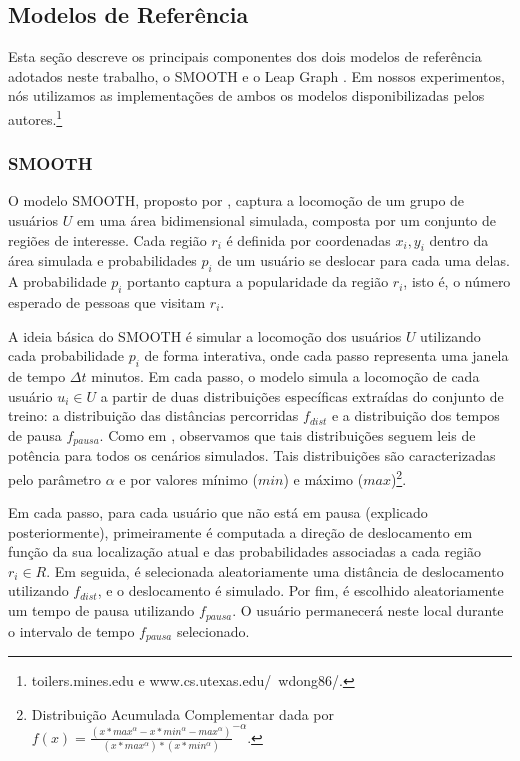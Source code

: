 \documentclass[10pt, a4paper, onecolumn, conference, compsocconf]{IEEEtran}
\begin{document}
\subsection{Modelos de Referência}\label{subsub:modelos}

Esta seção descreve os principais componentes dos dois modelos de referência adotados neste trabalho, o SMOOTH \cite{Munjal2011} e o Leap Graph \cite{Dong2013}. Em nossos experimentos, nós utilizamos as implementações de ambos os modelos disponibilizadas pelos autores.\footnote{toilers.mines.edu e www.cs.utexas.edu/~wdong86/.} 
 
\subsubsection{SMOOTH}\label{subsub:smooth}

O modelo SMOOTH, proposto por \cite{Munjal2011}, captura a locomoção de um grupo de usuários $U$ em uma área bidimensional simulada, composta por um conjunto de regiões de interesse. Cada região $r_i$ é definida por coordenadas $x_i, y_i$ dentro da área simulada e  probabilidades $p_i$ de um usuário se deslocar para cada uma delas. A probabilidade $p_i$ portanto captura a popularidade da região $r_i$, isto é, o número esperado de pessoas que visitam $r_i$.  

A ideia básica do SMOOTH é simular a locomoção dos usuários $U$ utilizando cada probabilidade $p_i$ de forma interativa, onde cada passo representa uma janela de tempo $\Delta t$ minutos. Em cada passo, o modelo simula a locomoção de cada usuário $u_i \in U$  a partir de duas distribuições específicas extraídas do conjunto de treino: a distribuição das distâncias percorridas $f_{dist}$  e a distribuição dos tempos de pausa $f_{pausa}$.  Como em \cite{Munjal2011}, observamos que tais distribuições seguem leis de potência para todos os cenários simulados. Tais distribuições são caracterizadas pelo  parâmetro  $\alpha$ e por valores mínimo ($min$) e máximo ($max$)\footnote{Distribuição Acumulada Complementar dada por $f(x) = \frac{(x*max^\alpha - x*min^\alpha -max^\alpha)}{(x*max^\alpha)*(x*min^\alpha)}^{-\alpha}$. }.    

Em cada passo,  para cada usuário que não está em pausa (explicado posteriormente), primeiramente é computada a direção de deslocamento  em função da sua localização atual  e das probabilidades associadas a cada região $r_i \in R$.  Em seguida,  é selecionada aleatoriamente uma distância de deslocamento utilizando $f_{dist}$, e o deslocamento é simulado. Por fim, é escolhido aleatoriamente um tempo de pausa utilizando $f_{pausa}$. O usuário permanecerá neste local durante o intervalo de tempo $f_{pausa}$ selecionado. 
\end{document}
